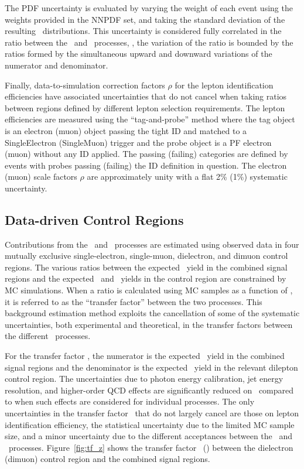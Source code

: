 The PDF uncertainty is evaluated by varying the weight of each event using the weights provided in the NNPDF set, and taking the standard deviation of the resulting \ETg\ distributions. 
This uncertainty is considered fully correlated in the ratio between the \zinvg\ and \wlng\ processes, \ie, the variation of the ratio is bounded by the ratios formed by the simultaneous upward and downward variations of the numerator and denominator.

Finally, data-to-simulation correction factors $\rho$ for the lepton identification efficiencies have associated uncertainties that do not cancel when taking ratios between regions defined by different lepton selection requirements.
The lepton efficiencies are measured using the ``tag-and-probe'' method where the tag object is an electron (muon) object passing the tight ID  and matched to a SingleElectron (SingleMuon) trigger and the probe object is a PF electron (muon) without any ID applied.
The passing (failing) categories are defined by events with probes passing (failing) the ID definition in question.
The electron (muon) scale factors $\rho$ are approximately unity with a flat 2\% (1\%) systematic uncertainty.

\subsection{Data-driven Control Regions}
\label{sec:control_regions}

Contributions from the \zinvg\ and \wlng\ processes are estimated using observed data in four mutually exclusive single-electron, single-muon, dielectron, and dimuon control regions.
The various ratios between the expected \zinvg\ yield in the combined signal regions and the expected \wlng\ and \zllg\ yields in the control region are constrained by MC simulations.
When a ratio is calculated using MC samples as a function of \ETg, it is referred to as the ``transfer factor'' between the two processes.
This background estimation method exploits the cancellation of some of the systematic uncertainties, both experimental and theoretical, in the transfer factors between the different  \vg\ processes.
 
For the transfer factor \RZll, the numerator is the expected \zinvg\ yield in the combined signal regions and the denominator is the expected \zllg\ yield in the relevant dilepton control region.
The uncertainties due to photon energy calibration, jet energy resolution, and higher-order QCD effects are significantly reduced on \RZll\ compared to when such effects are considered for individual processes. 
The only uncertainties in the transfer factor \RZll\ that do not largely cancel are those on lepton identification efficiency, the statistical uncertainty due to the limited MC sample size, and a minor uncertainty due to the different acceptances between the \zinvg\ and \zllg\ processes.
Figure~\ref{fig:tf_z} shows the transfer factor \RZee\ (\RZmm) between the dielectron (dimuon) control region and the combined signal regions.

